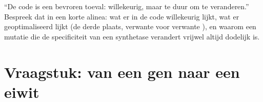 \begin{exercise}[$\star\star\star$]\label{exo:b1:gene-expression:12}
``De code is een bevroren toeval: willekeurig, maar te duur om te veranderen.''
Bespreek dat in een korte alinea: wat er in de code willekeurig lijkt, wat er
geoptimaliseerd lijkt (de derde plaats, verwante  voor verwante ),
en waarom een mutatie die de specificiteit van een synthetase verandert vrijwel
altijd dodelijk is.
\end{exercise}

\section{Vraagstuk: van een gen naar een eiwit}

